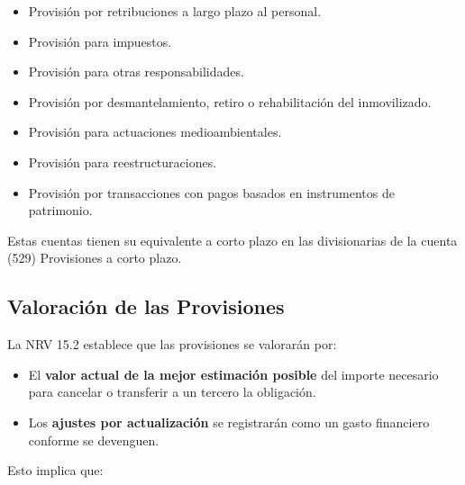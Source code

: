 \documentclass[
  paper=a4,
  ,captions=tableheading
]{scrbook}
\providecommand{\tightlist}{%
  \setlength{\itemsep}{0pt}\setlength{\parskip}{0pt}}
\begin{document}
\begin{itemize}
\tightlist
\item
  Provisión por retribuciones a largo plazo al personal.
\item
  Provisión para impuestos.
\item
  Provisión para otras responsabilidades.
\item
  Provisión por desmantelamiento, retiro o rehabilitación del
  inmovilizado.
\item
  Provisión para actuaciones medioambientales.
\item
  Provisión para reestructuraciones.
\item
  Provisión por transacciones con pagos basados en instrumentos de
  patrimonio.
\end{itemize}

Estas cuentas tienen su equivalente a corto plazo en las divisionarias
de la cuenta (529) Provisiones a corto plazo.

\hypertarget{valoraciuxf3n-de-las-provisiones}{%
\subsection{Valoración de las
Provisiones}\label{valoraciuxf3n-de-las-provisiones}}

La NRV 15.2 establece que las provisiones se valorarán por:

\begin{itemize}
\tightlist
\item
  El \textbf{valor actual de la mejor estimación posible} del importe
  necesario para cancelar o transferir a un tercero la obligación.
\item
  Los \textbf{ajustes por actualización} se registrarán como un gasto
  financiero conforme se devenguen.
\end{itemize}

Esto implica que:
\end{document}
